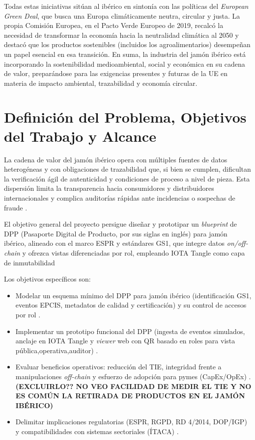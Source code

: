 Todas estas iniciativas sitúan al ibérico en sintonía con las políticas del \textit{European Green Deal}, que busca una Europa climáticamente neutra, circular y justa. La propia Comisión Europea, en el Pacto Verde Europeo de 2019, recalcó la necesidad de transformar la economía hacia la neutralidad climática al 2050 y destacó que los productos sostenibles (incluidos los agroalimentarios) desempeñan un papel esencial en esa transición.
En suma, la industria del jamón ibérico está incorporando la sostenibilidad medioambiental, social y económica en su cadena de valor, preparándose para las exigencias presentes y futuras de la UE en materia de impacto ambiental, trazabilidad y economía circular.

\section{Definición del Problema, Objetivos del Trabajo y Alcance}\label{sec:intro-definición}
La cadena de valor del jamón ibérico opera con múltiples fuentes de datos heterogéneas y con obligaciones de trazabilidad que, si bien se cumplen, dificultan la verificación ágil de autenticidad y condiciones de proceso a nivel de pieza. Esta dispersión limita la transparencia hacia consumidores y distribuidores internacionales y complica auditorías rápidas ante incidencias o sospechas de fraude \cite{}.

El objetivo general del proyecto persigue diseñar y prototipar un \textit{blueprint} de DPP (Pasaporte Digital de Producto, por sus siglas en inglés) para jamón ibérico, alineado con el marco ESPR y estándares GS1, que integre datos \textit{on/off-chain} y ofrezca vistas diferenciadas por rol, empleando IOTA Tangle como capa de inmutabilidad \cite{}

Los objetivos específicos son:
\begin{itemize}
\item Modelar un esquema mínimo del DPP para jamón ibérico (identificación GS1, eventos EPCIS, metadatos de calidad y certificación) y su control de accesos por rol \cite{}.
\item Implementar un prototipo funcional del DPP (ingesta de eventos simulados, anclaje en IOTA Tangle y \textit{viewer} web con QR basado en roles para vista pública,operativa,auditor) \cite{}.
\item Evaluar beneficios operativos: reducción del TIE, integridad frente a manipulaciones \textit{off-chain} y esfuerzo de adopción para pymes (CapEx/OpEx) \cite{}. \textbf{(EXCLUIRLO?? NO VEO FACILIDAD DE MEDIR EL TIE Y NO ES COMÚN LA RETIRADA DE PRODUCTOS EN EL JAMÓN IBÉRICO)}
\item Delimitar implicaciones regulatorias (ESPR, RGPD, RD 4/2014, DOP/IGP) y compatibilidades con sistemas sectoriales (ÍTACA) \cite{}.
\end{itemize}

